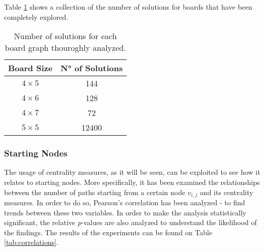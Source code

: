 \documentclass[conference]{IEEEtran}
\begin{document}
Table \ref{tab:sols} shows a collection of the number of solutions for boards that have been completely explored.

\begin{table}[ht]
	\centering
	\begin{tabular}{|c|c|}
		\hline
		\textbf{Board Size} & \textbf{N° of Solutions} \\ \hline
		\textbf{$4 \times 5$} & 144	\\ \hline
		\textbf{$4 \times 6$} & 128	\\ \hline
		\textbf{$4 \times 7$} & 72  \\ \hline
		\textbf{$5 \times 5$} & 12400 \\ \hline 
	\end{tabular}
	\caption{Number of solutions for each board graph thouroghly analyzed.}
	\label{tab:sols}
\end{table}

\subsubsection{Starting Nodes}
The usage of centrality measures, as it will be seen, can be exploited to see how it relates to starting nodes. More specifically, it has been examined the relationships between the number of paths starting from a certain node $v_{i, j}$ and its centrality measures. In order to do so, Pearson's correlation has been analyzed - to find trends between these two variables. In order to make the analysis statistically significant, the relative \textit{p}-values are also analyzed to understand the likelihood of the findings. The results of the experiments can be found on Table \ref{tab:correlations}.
\end{document}
